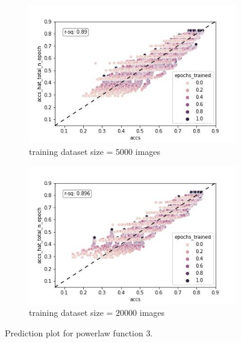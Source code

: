 \documentclass{article} %
\begin{document}
\begin{figure}
    \begin{subfigure}{.5\textwidth}
        \centering
        \includegraphics[width=.8\linewidth]{powerlaw_train_accs_hat_total_n_epoch}
        \caption{training dataset size = $5000$ images}
        \label{fig:powerlaw_accs_hat_total_n_epoch_train}
    \end{subfigure}%
    \begin{subfigure}{.5\textwidth}
        \centering
        \includegraphics[width=.8\linewidth]{powerlaw_val_accs_hat_total_n_epoch}
        \caption{training dataset size = $20000$ images}
        \label{fig:powerlaw_accs_hat_total_n_epoch_val}
    \end{subfigure}
    \caption{Prediction plot for powerlaw function 3.}
    \label{fig:powerlaw_accs_hat_total_n_epoch}
\end{figure}
\end{document}
